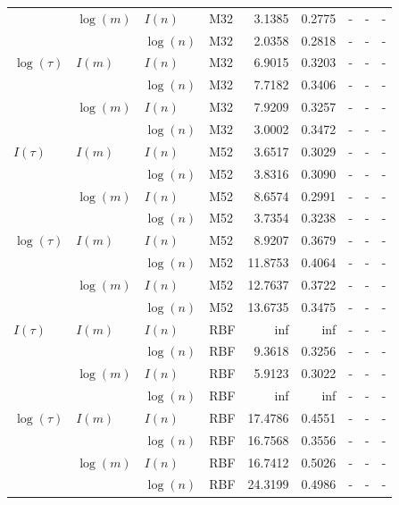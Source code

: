 \begin{table}
\begin{tabularx}{1\textwidth}{|llllrr >{\raggedright\arraybackslash}X>{\raggedright\arraybackslash}X>{\raggedright\arraybackslash}X|}
   & $\log({m})$ & $I({n})$ & M32 & 3.1385 & 0.2775 &  - &  - & - \\
   &  & $\log({n})$ & M32 & 2.0358 & 0.2818 &  - &  - & - \\
 $\log({\tau})$ & $I({m})$ & $I({n})$ & M32 & 6.9015 & 0.3203 &  - &  - & - \\
   &  & $\log({n})$ & M32 & 7.7182 & 0.3406 &  - &  - & - \\
   & $\log({m})$ & $I({n})$ & M32 & 7.9209 & 0.3257 &  - &  - & - \\
   &  & $\log({n})$ & M32 & 3.0002 & 0.3472 &  - &  - & - \\
 $I({\tau})$ & $I({m})$ & $I({n})$ & M52 & 3.6517 & 0.3029 &  - &  - & - \\
   &  & $\log({n})$ & M52 & 3.8316 & 0.3090 &  - &  - & - \\
   & $\log({m})$ & $I({n})$ & M52 & 8.6574 & 0.2991 &  - &  - & - \\
   &  & $\log({n})$ & M52 & 3.7354 & 0.3238 &  - &  - & - \\
 $\log({\tau})$ & $I({m})$ & $I({n})$ & M52 & 8.9207 & 0.3679 &  - &  - & - \\
   &  & $\log({n})$ & M52 & 11.8753 & 0.4064 &  - &  - & - \\
   & $\log({m})$ & $I({n})$ & M52 & 12.7637 & 0.3722 &  - &  - & - \\
   &  & $\log({n})$ & M52 & 13.6735 & 0.3475 &  - &  - & - \\
 $I({\tau})$ & $I({m})$ & $I({n})$ & RBF & inf & inf &  - &  - & - \\
   &  & $\log({n})$ & RBF & 9.3618 & 0.3256 &  - &  - & - \\
   & $\log({m})$ & $I({n})$ & RBF & 5.9123 & 0.3022 &  - &  - & - \\
   &  & $\log({n})$ & RBF & inf & inf &  - &  - & - \\
 $\log({\tau})$ & $I({m})$ & $I({n})$ & RBF & 17.4786 & 0.4551 &  - &  - & - \\
   &  & $\log({n})$ & RBF & 16.7568 & 0.3556 &  - &  - & - \\
   & $\log({m})$ & $I({n})$ & RBF & 16.7412 & 0.5026 &  - &  - & - \\
   &  & $\log({n})$ & RBF & 24.3199 & 0.4986 &  - &  - & - \\
 \hline
 \end{tabularx}
\end{table}




